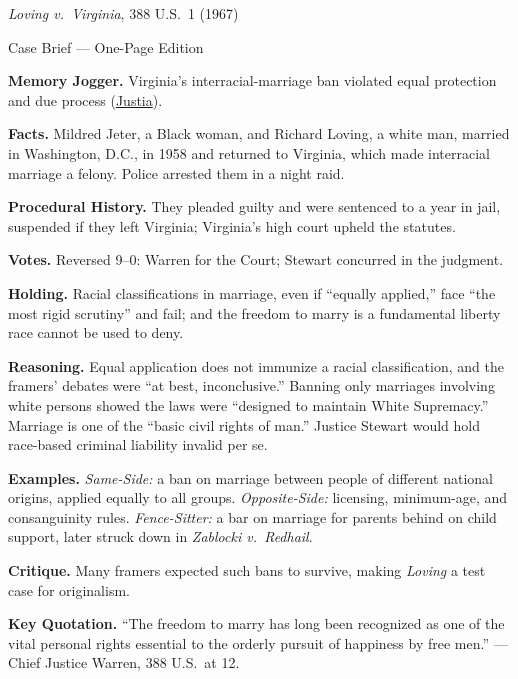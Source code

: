 \documentclass[12pt]{article}
\begin{document}
\begin{center}
{\Large \textit{Loving v.\ Virginia}, 388 U.S.\ 1 (1967)\par}
\vspace{0.3em}
{\normalsize Case Brief --- One-Page Edition\par}
\end{center}

\textbf{Memory Jogger.} Virginia's interracial-marriage ban violated equal protection and due process (\href{https://supreme.justia.com/cases/federal/us/388/1/}{Justia}).

\textbf{Facts.} Mildred Jeter, a Black woman, and Richard Loving, a white man, married in Washington, D.C., in 1958 and returned to Virginia, which made interracial marriage a felony. Police arrested them in a night raid.

\textbf{Procedural History.} They pleaded guilty and were sentenced to a year in jail, suspended if they left Virginia; Virginia's high court upheld the statutes.

\textbf{Votes.} Reversed 9--0: Warren for the Court; Stewart concurred in the judgment.

\textbf{Holding.} Racial classifications in marriage, even if ``equally applied,'' face ``the most rigid scrutiny'' and fail; and the freedom to marry is a fundamental liberty race cannot be used to deny.

\textbf{Reasoning.} Equal application does not immunize a racial classification, and the framers' debates were ``at best, inconclusive.'' Banning only marriages involving white persons showed the laws were ``designed to maintain White Supremacy.'' Marriage is one of the ``basic civil rights of man.'' Justice Stewart would hold race-based criminal liability invalid per se.

\textbf{Examples.} \emph{Same-Side:} a ban on marriage between people of different national origins, applied equally to all groups. \emph{Opposite-Side:} licensing, minimum-age, and consanguinity rules. \emph{Fence-Sitter:} a bar on marriage for parents behind on child support, later struck down in \textit{Zablocki v.\ Redhail}.

\textbf{Critique.} Many framers expected such bans to survive, making \textit{Loving} a test case for originalism.

\textbf{Key Quotation.} ``The freedom to marry has long been recognized as one of the vital personal rights essential to the orderly pursuit of happiness by free men.'' --- Chief Justice Warren, 388 U.S.\ at 12.
\end{document}

